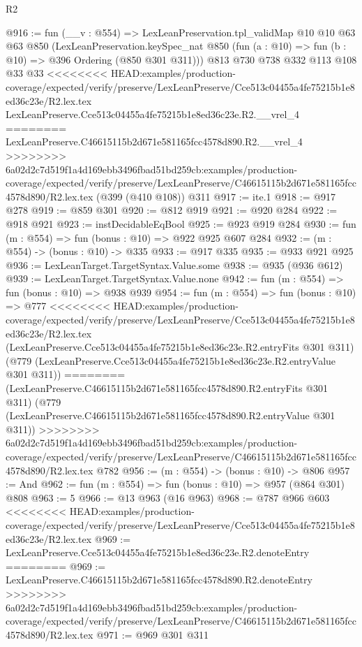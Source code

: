 \begin{lexlean}{R2}
\begin{coremodule}
{{{{{{{{{{{{{{{{{{{{{{@916 := fun (__v : @554) =>
  LexLeanPreservation.tpl_validMap
    @10
    @10
    @63
    @63
    @850
    (LexLeanPreservation.keySpec_nat
      @850
      (fun (a : @10) => fun (b : @10) => @396 Ordering (@850 @301 @311)))
    @813
    @730
    @738
    @332
    @113
    @108
    @33
    @33
<<<<<<<< HEAD:examples/production-coverage/expected/verify/preserve/LexLeanPreserve/Cce513c04455a4fe75215b1e8ed36c23e/R2.lex.tex
    LexLeanPreserve.Cce513c04455a4fe75215b1e8ed36c23e.R2.__vrel_4
========
    LexLeanPreserve.C46615115b2d671e581165fcc4578d890.R2.__vrel_4
>>>>>>>> 6a02d2c7d519f1a4d169ebb3496fbad51bd259cb:examples/production-coverage/expected/verify/preserve/LexLeanPreserve/C46615115b2d671e581165fcc4578d890/R2.lex.tex
    (@399 (@410 @108))
    @311
@917 := ite.{1}
@918 := @917 @278
@919 := @859 @301
@920 := @812 @919
@921 := @920 @284
@922 := @918 @921
@923 := instDecidableEqBool
@925 := @923 @919 @284
@930 := fun (m : @554) => fun (bonus : @10) => @922 @925 @607 @284
@932 := (m : @554) -> (bonus : @10) -> @335
@933 := @917 @335
@935 := @933 @921 @925
@936 := LexLeanTarget.TargetSyntax.Value.some
@938 := @935 (@936 @612)
@939 := LexLeanTarget.TargetSyntax.Value.none
@942 := fun (m : @554) => fun (bonus : @10) => @938 @939
@954 := fun (m : @554) =>
  fun (bonus : @10) =>
  @777
<<<<<<<< HEAD:examples/production-coverage/expected/verify/preserve/LexLeanPreserve/Cce513c04455a4fe75215b1e8ed36c23e/R2.lex.tex
    (LexLeanPreserve.Cce513c04455a4fe75215b1e8ed36c23e.R2.entryFits @301 @311)
    (@779 (LexLeanPreserve.Cce513c04455a4fe75215b1e8ed36c23e.R2.entryValue @301 @311))
========
    (LexLeanPreserve.C46615115b2d671e581165fcc4578d890.R2.entryFits @301 @311)
    (@779 (LexLeanPreserve.C46615115b2d671e581165fcc4578d890.R2.entryValue @301 @311))
>>>>>>>> 6a02d2c7d519f1a4d169ebb3496fbad51bd259cb:examples/production-coverage/expected/verify/preserve/LexLeanPreserve/C46615115b2d671e581165fcc4578d890/R2.lex.tex
    @782
@956 := (m : @554) -> (bonus : @10) -> @806
@957 := And
@962 := fun (m : @554) => fun (bonus : @10) => @957 (@864 @301) @808
@963 := 5
@966 := @13 @963 (@16 @963)
@968 := @787 @966 @603
<<<<<<<< HEAD:examples/production-coverage/expected/verify/preserve/LexLeanPreserve/Cce513c04455a4fe75215b1e8ed36c23e/R2.lex.tex
@969 := LexLeanPreserve.Cce513c04455a4fe75215b1e8ed36c23e.R2.denoteEntry
========
@969 := LexLeanPreserve.C46615115b2d671e581165fcc4578d890.R2.denoteEntry
>>>>>>>> 6a02d2c7d519f1a4d169ebb3496fbad51bd259cb:examples/production-coverage/expected/verify/preserve/LexLeanPreserve/C46615115b2d671e581165fcc4578d890/R2.lex.tex
@971 := @969 @301 @311
}}}}}}}}}}}}}}}}}}}}}}
\end{coremodule}
\end{lexlean}
